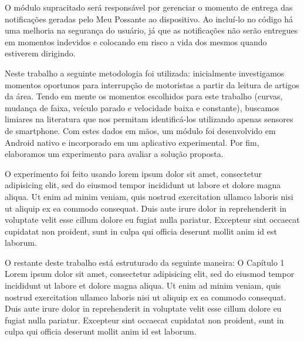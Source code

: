 O módulo supracitado será responsável por gerenciar o momento de entrega das notificações geradas pelo Meu Possante ao dispositivo. Ao
incluí-lo no código há uma melhoria na segurança do usuário, já que as notificações não serão entregues em momentos indevidos e
colocando em risco a vida dos mesmos quando estiverem dirigindo.

Neste trabalho a seguinte metodologia foi utilizada: inicialmente investigamos momentos oportunos para interrupção de motoristas a partir
da leitura de artigos da área. Tendo em mente os momentos escolhidos para este trabalho (curvas, mudança de faixa, veículo parado e velocidade
baixa e constante), buscamos limiares na literatura que nos permitam identificá-los utilizando apenas sensores de smartphone. Com estes
dados em mãos, um módulo foi desenvolvido em Android nativo e incorporado em um aplicativo experimental. Por fim, elaboramos um experimento
para avaliar a solução proposta.

O experimento foi feito usando lorem ipsum dolor sit amet, consectetur adipisicing elit, sed do eiusmod tempor incididunt ut labore et dolore
magna aliqua. Ut enim ad minim veniam, quis nostrud exercitation ullamco laboris nisi ut aliquip ex ea commodo consequat. Duis aute irure dolor
in reprehenderit in voluptate velit esse cillum dolore eu fugiat nulla pariatur. Excepteur sint occaecat cupidatat non proident, sunt in
culpa qui officia deserunt mollit anim id est laborum.

O restante deste trabalho está estruturado da seguinte maneira: O Capítulo 1 Lorem ipsum dolor sit amet, consectetur adipisicing elit, sed do
eiusmod tempor incididunt ut labore et dolore magna aliqua. Ut enim ad minim veniam, quis nostrud exercitation ullamco laboris nisi ut aliquip
ex ea commodo consequat. Duis aute irure dolor in reprehenderit in voluptate velit esse cillum dolore eu fugiat nulla pariatur. Excepteur sint
occaecat cupidatat non proident, sunt in culpa qui officia deserunt mollit anim id est laborum.
